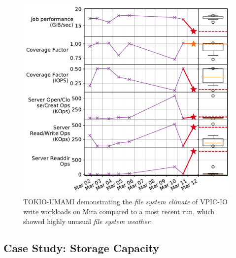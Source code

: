 \begin{figure}[t]
    \centering
    \includegraphics[width=1.0\columnwidth]{figs/umami-mira-fs1-vpic-write.pdf}
    \caption{TOKIO-UMAMI demonstrating the \emph{file system climate} of VPIC-IO write workloads
    on Mira compared to a most recent run, which showed
    highly unusual \emph{file system weather}.}
    \label{fig:umami-mira-fs1-vpic-write}
\end{figure}

\subsection{Case Study: Storage Capacity}



